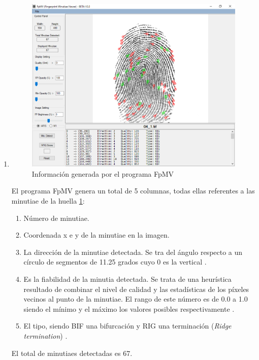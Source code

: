 \documentclass[10pt,a4paper]{article}
\begin{document}
\subsection{}

\begin{enumerate}[label=\textbf{\alph*)}]
\item \begin{figure}
  \centering
  \includegraphics[width=.9\linewidth]{2_1.png}
  \caption{Información generada por el programa FpMV}
  \label{fig:FpMV}
\end{figure}

El programa FpMV genera un total de 5 columnas, todas ellas referentes a las minutiae de la huella \ref{fig:FpMV}:
\begin{enumerate}[label=\textbf{\arabic*)}]
\item Número de minutiae.
\item Coordenada x e y de la minutiae en la imagen.
\item La dirección de la minutiae detectada. Se tra del ángulo respecto a un círculo de segmentos de 11.25 grados cuyo 0 es la vertical \cite{nist}.
\item Es la fiabilidad de la minutia detectada. Se trata de una heurística resultado de combinar el nivel de calidad y las estadísticas de los píxeles vecinos al punto de la minutiae. El rango de este número es de 0.0 a 1.0 siendo el mínimo y el máximo los valores posibles respectivamente \cite{nist}.
\item El tipo, siendo BIF una bifurcación y RIG una terminación (\textit{Ridge termination}) \cite{nist}.
\end{enumerate}
El total de minutiaes detectadas es 67.


\end{enumerate}
\end{document}
